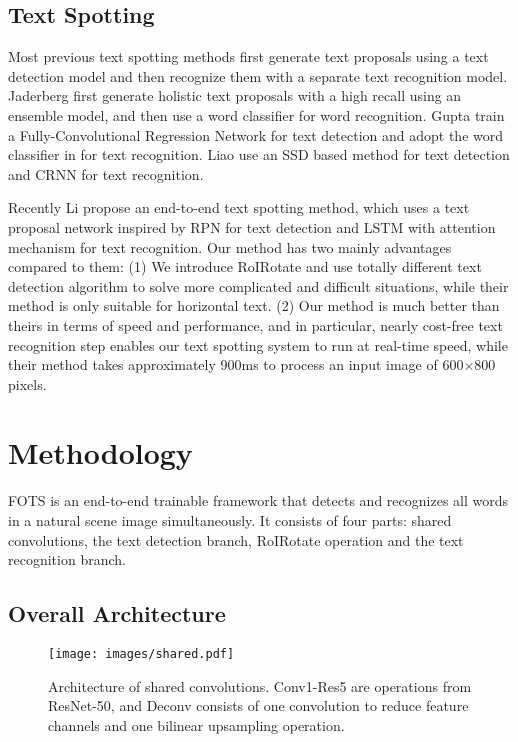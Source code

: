 \documentclass[10pt,twocolumn,letterpaper]{article}
\begin{document}
\subsection{Text Spotting}
Most previous text spotting methods first generate text proposals using a text detection model and then recognize them with a separate text recognition model. Jaderberg \etal \cite{jaderberg2016ijcv} first generate holistic text proposals with a high recall using an ensemble model, and then use a word classifier for word recognition. Gupta \etal \cite{gupta2016synthetic} train a Fully-Convolutional Regression Network for text detection and adopt the word classifier in \cite{jaderberg2014synthetic} for text recognition. Liao \etal \cite{liao2017textboxes} use an SSD \cite{liu2016ssd} based method for text detection and CRNN \cite{shi2016crnn} for text recognition.

Recently Li \etal \cite{li2017iccv} propose an end-to-end text spotting method, which uses a text proposal network inspired by RPN \cite{ren2015faster} for text detection and LSTM with attention mechanism \cite{luong2015effective,shi2016robust,Chen2004Detecting} for text recognition. Our method has two mainly advantages compared to them: (1) We introduce RoIRotate and use totally different text detection algorithm to solve more complicated and difficult situations, while their method is only suitable for horizontal text. (2) Our method is much better than theirs in terms of speed and performance, and in particular, nearly cost-free text recognition step enables our text spotting system to run at real-time speed, while their method takes approximately 900ms to process an input image of 600$\times$800 pixels.


\section{Methodology}
FOTS is an end-to-end trainable framework that detects and recognizes all words in a natural scene image simultaneously. It consists of four parts: shared convolutions, the text detection branch, RoIRotate operation and the text recognition branch.

\subsection{Overall Architecture}
\label{overall}

\begin{figure}
\texttt{[image: images/shared.pdf]}
\vspace{5pt}
\caption{Architecture of shared convolutions. Conv1-Res5 are operations from ResNet-50, and Deconv consists of one convolution to reduce feature channels and one bilinear upsampling operation.}
\label{fig:shared}
\end{figure}
\end{document}
